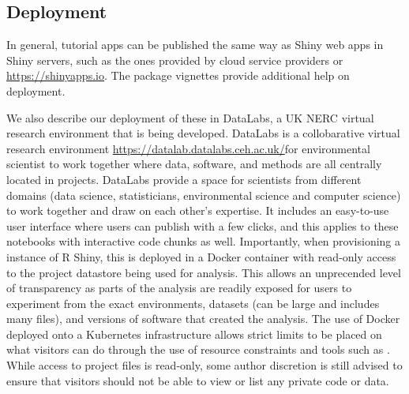 \hypertarget{deployment}{%
\subsection{Deployment}\label{deployment}}

In general, \DIFdelbegin \emph{} %
\DIFdelend \DIFaddbegin {} \DIFaddend tutorial apps can be published the same way
as \DIFaddbegin {}\DIFaddend Shiny web apps in Shiny servers, such as the ones provided by cloud
service providers or \url{https://shinyapps.io}. The \DIFdelbegin \emph{}
\DIFdelend \DIFaddbegin {}
\DIFaddend package vignettes provide additional help on deployment.

We also describe our deployment of these \DIFdelbegin {}\DIFdelend \DIFaddbegin {}\DIFaddend in DataLabs, a UK NERC
virtual research environment that is being developed. DataLabs is a
collobarative virtual research environment \citep{Hollaway2020}
\DIFaddbegin \DIFadd{(}\url{https://datalab.datalabs.ceh.ac.uk/}\DIFadd{) }\DIFaddend for environmental scientist
to work together where data, software, and methods are all centrally
located in projects. DataLabs provide a space for scientists from
different domains (data science, statisticians, environmental science
and computer science) to work together and draw on each other's
expertise. It includes an easy-to-use user interface where users can
publish \DIFdelbegin {}\DIFdelend \DIFaddbegin {}\DIFaddend with a few clicks, and this applies to these
notebooks with interactive code chunks as well. Importantly, when
provisioning a instance of R Shiny, this is deployed in a Docker
container with read-only access to the project datastore being used for
analysis. This allows an unprecended level of transparency as parts of
the analysis are readily exposed for users to experiment from the exact
environments, datasets (can be large and includes many files), and
versions of software that created the analysis. The use of Docker
deployed onto a Kubernetes infrastructure allows strict limits to be
placed on what visitors can do through the use of resource constraints
and tools such as \DIFdelbegin {}\DIFdelend \DIFaddbegin {} \DIFaddend \citep{RAppArmor}. While access to
project files is read-only, some author discretion is still advised to
ensure that visitors should not be able to view or list any private code
or data. \DIFaddbegin {} \DIFaddend 

